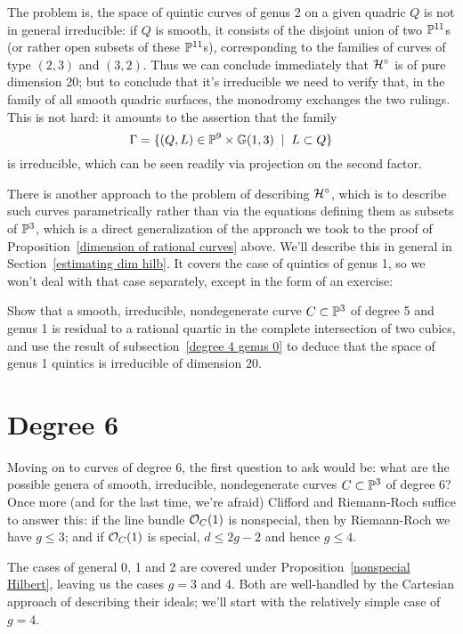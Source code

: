 The problem is, the space of quintic curves of genus 2 on a given quadric $Q$ is not in general irreducible: if $Q$ is smooth, it consists of the disjoint union of two ${\mathbb P}^{11}$s (or rather open subsets of these ${\mathbb P}^{11}$s), corresponding to the families of curves of type $(2,3)$ and $(3,2)$. Thus we can conclude immediately that ${\cal H}^\circ$ is of pure dimension 20; but to conclude that it's irreducible we need to verify that, in the family of all smooth quadric surfaces, the monodromy exchanges the two rulings. This is not hard: it amounts to the assertion that the family
$$
\Gamma = \{ (Q,L) \in {\mathbb P}^9 \times {\mathbb G}(1,3) \; \mid \; L \subset Q \}
$$
is irreducible, which can be seen readily via projection on the second factor.

There is another approach to the problem of describing ${\cal H}^\circ$, which is to describe such curves parametrically rather than via the equations defining them as subsets of ${\mathbb P}^3$, which is a direct generalization of the approach we took to the proof of Proposition~\ref{dimension of rational curves} above. We'll describe this in general in Section~\ref{estimating dim hilb}. It covers the case of quintics of genus 1, so we won't deal with that case separately, except in the form of an exercise:

\begin{exercise}
Show that a smooth, irreducible, nondegenerate curve $C \subset {\mathbb P}^3$ of degree 5 and genus 1 is residual to a rational quartic in the complete intersection of two cubics, and use the result of subsection~\ref{degree 4 genus 0} to deduce that the space of genus 1 quintics is irreducible of dimension 20.
\end{exercise}



\section{Degree 6}

Moving on to curves of degree 6, the first question to ask would be: what are the possible genera of smooth, irreducible, nondegenerate curves $C \subset {\mathbb P}^3$ of degree 6? Once more (and for the last time, we're afraid) Clifford and Riemann-Roch suffice to answer this: if the line bundle ${\mathcal O}_C(1)$ is nonspecial, then by Riemann-Roch we have $g \leq 3$; and if ${\mathcal O}_C(1)$ is special, $d \leq 2g-2$ and hence $g \leq 4$.

The cases of general 0, 1 and 2 are covered under Proposition~\ref{nonspecial Hilbert}, leaving us the cases $g = 3$ and 4. Both are well-handled by the Cartesian approach of describing their ideals; we'll start with the relatively simple case of $g=4$.

